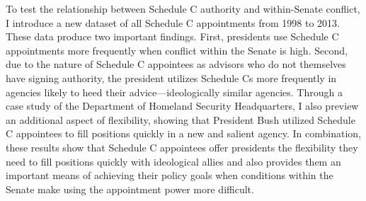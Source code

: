 \documentclass[12pt]{article}
\begin{document}
	To test the relationship between Schedule C authority and within-Senate conflict, I introduce a new dataset of all Schedule C appointments from 1998 to 2013. These data produce two important findings. First, presidents use Schedule C appointments more frequently when conflict within the Senate is high. Second, due to the nature of Schedule C appointees as advisors who do not themselves have signing authority, the president utilizes Schedule Cs more frequently in agencies likely to heed their advice---ideologically similar agencies. Through a case study of the Department of Homeland Security Headquarters, I also preview an additional aspect of flexibility, showing that President Bush utilized Schedule C appointees to fill positions quickly in a new and salient agency. In combination, these results show that Schedule C appointees offer presidents the flexibility they need to fill positions quickly with ideological allies and also provides them an important means of achieving their policy goals when conditions within the Senate make using the appointment power more difficult.
\end{document}
